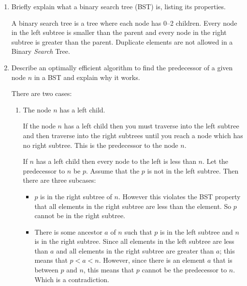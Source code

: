 \documentclass[10pt,\jkfside,a4paper]{article}
\begin{document}
\begin{enumerate}
\begin{center}
\end{center}


\item Briefly explain what a binary search tree (BST) is, listing its properties.

A binary search tree is a tree where each node has 0--2 children. Every node in the left subtree is smaller
than the parent and every node in the right subtree is greater than the parent. Duplicate 
elements are not allowed in a Binary \textit{Search} Tree.

\item Describe an optimally efficient algorithm to find the predecessor of a given node $n$ in a BST and 
explain why it works.

There are two cases:

\begin{enumerate}

\item The node $n$ has a left child.

If the node $n$ has a left child then you must traverse into the left subtree and then traverse into the right 
subtrees until you reach a node which has no right subtree. This is the predecessor to the node $n$.

If $n$ has a left child then every node to the left is less than $n$.
Let the predecessor to $n$ be $p$. Assume that the $p$ is not in the left subtree. 
Then there are three subcases:
\begin{itemize}

\item $p$ is in the right subtree of $n$. However this violates the BST property that all elements in the right 
subtree are less than the element. So $p$ cannot be in the right subtree.

\item There is some ancestor $a$ of $n$ such that $p$ is in the left subtree and $n$ is in the right subtree. 
Since all elements in the left subtree are less than $a$ and all elements in the right subtree are greater than $a$; 
this means that $p < a < n$. However, since there is an element $a$ that is between $p$ and $n$, this means that 
$p$ cannot be the predecessor to $n$. Which is a contradiction.


\end{itemize}
\end{enumerate}
\end{enumerate}
\end{document}
